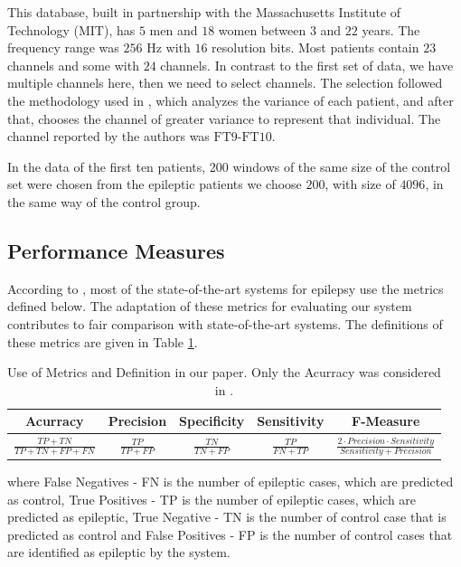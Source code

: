 This database, built in partnership with the Massachusetts Institute of Technology (MIT), has $5$ men and $18$ women between $3$ and $22$ years. The frequency range was $256$ Hz with $16$ resolution bits. Most patients contain $ 23 $ channels and some with $24$ channels. In contrast to the first set of data, we have multiple channels here, then we need to select channels. The selection followed the methodology used in \cite{shoeb2009application}, which analyzes the variance of each patient, and after that, chooses the channel of greater variance to represent that individual. The channel reported by the authors was $\text{FT9-FT10}$.

In the data of the first ten patients, 200 windows of the same size of the control set were chosen from the epileptic patients we choose $200$, with size of $4096$, in the same way of the control group.


\subsection{Performance Measures}

According to \cite{roy2019deep}, most of the state-of-the-art systems for epilepsy use the metrics defined below. The adaptation of these metrics for evaluating our system contributes to fair comparison with state-of-the-art systems. The definitions of these metrics are given in Table \ref{table:metrics}.

\begin{table}[!ht]
\centering
\begin{tabular}{ccccc}
\hline
 \textbf{Acurracy} & \textbf{Precision} & \textbf{Specificity} & \textbf{Sensitivity} & \textbf{F-Measure} \\ \hline
 $\frac{TP+TN}{TP+TN+FP+FN}$ & $\frac{TP}{TP+FP}$ & $\frac{TN}{TN+FP}$ & $\frac{TP}{FN+TP}$ & $\frac{2\cdot Precision \cdot Sensitivity}{Sensitivity+Precision}$\\ \hline
\end{tabular}
\caption{Use of Metrics and Definition in our paper. Only the Acurracy was considered in \cite{WenZha:2018}.}
\label{table:metrics}
\end{table}

\noindent where False Negatives - FN is the number of epileptic cases, which are predicted as control, True Positives - TP is the number of epileptic cases, which are predicted as epileptic, True Negative - TN is the number of control case that is predicted as control and False Positives - FP is the number of control cases that are identified as epileptic by the system. 

